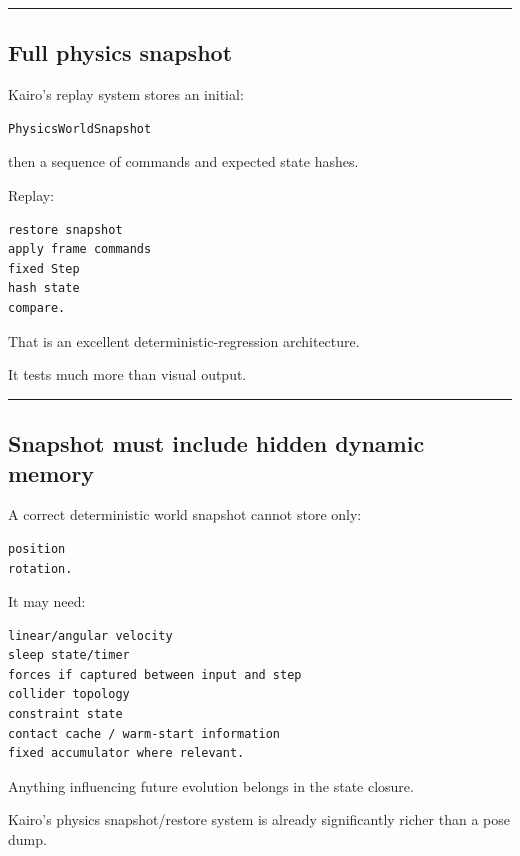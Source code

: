 \begin{center}\rule{0.5\linewidth}{0.5pt}\end{center}

\subsection{Full physics snapshot}\label{06-engine-ii-ch037-full-physics-snapshot}

Kairo's replay system stores an initial:

\begin{verbatim}
PhysicsWorldSnapshot
\end{verbatim}

then a sequence of commands and expected state hashes.

Replay:

\begin{verbatim}
restore snapshot
apply frame commands
fixed Step
hash state
compare.
\end{verbatim}

That is an excellent deterministic-regression architecture.

It tests much more than visual output.

\begin{center}\rule{0.5\linewidth}{0.5pt}\end{center}

\subsection{Snapshot must include hidden dynamic memory}\label{06-engine-ii-ch037-snapshot-must-include-hidden-dynamic-memory}

A correct deterministic world snapshot cannot store only:

\begin{verbatim}
position
rotation.
\end{verbatim}

It may need:

\begin{verbatim}
linear/angular velocity
sleep state/timer
forces if captured between input and step
collider topology
constraint state
contact cache / warm-start information
fixed accumulator where relevant.
\end{verbatim}

Anything influencing future evolution belongs in the state closure.

Kairo's physics snapshot/restore system is already significantly richer than a pose dump.

